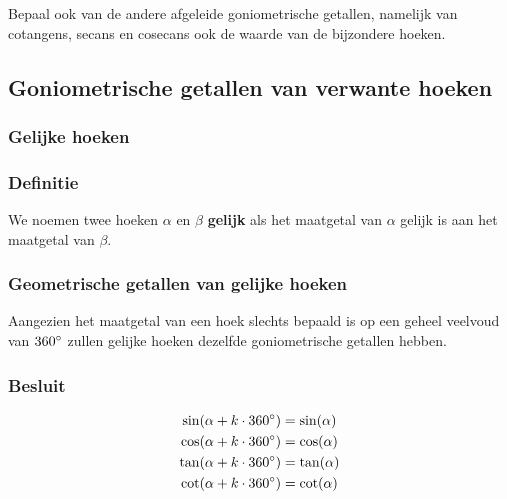 \documentclass[a4paper,12pt]{article}
\begin{document}
\begin{theorie}
\begin{center}
  \vspace*{0.5cm}
\end{center}

\end{theorie}

\begin{oefening}
Bepaal ook van de andere afgeleide goniometrische getallen, namelijk van cotangens, secans en cosecans ook de waarde van de bijzondere hoeken.
\end{oefening}

\begin{theorie}

\pagebreak
\subsection{Goniometrische getallen van verwante hoeken}

\subsubsection{Gelijke hoeken}

\subsubsection*{Definitie}
We noemen twee hoeken $\alpha$ en $\beta$ \textbf{gelijk} als het maatgetal van $\alpha$ gelijk is aan het maatgetal van $\beta$.

\subsubsection*{Geometrische getallen van gelijke hoeken}
Aangezien het maatgetal van een hoek slechts bepaald is op een geheel veelvoud van $360^\circ$ zullen gelijke hoeken dezelfde goniometrische getallen hebben.

\subsubsection*{Besluit}
\begin{align*}
\sin(\alpha+k\cdot 360^\circ)&=\sin(\alpha)\\
\cos(\alpha+k\cdot 360^\circ)&=\cos(\alpha)\\
\tan(\alpha+k\cdot 360^\circ)&=\tan(\alpha)\\
\cot(\alpha+k\cdot 360^\circ)&=\cot(\alpha)\\
\end{align*}

\end{theorie}
\end{document}
